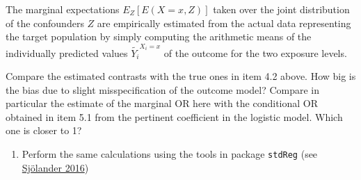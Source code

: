 \documentclass[
]{book}
\newenvironment{Shaded}{\begin{snugshade}}{\end{snugshade}}
\newcommand{\AttributeTok}[1]{\textcolor[rgb]{0.13,0.29,0.53}{#1}}
\newcommand{\DecValTok}[1]{\textcolor[rgb]{0.00,0.00,0.81}{#1}}
\newcommand{\FunctionTok}[1]{\textcolor[rgb]{0.13,0.29,0.53}{\textbf{#1}}}
\newcommand{\NormalTok}[1]{#1}
\newcommand{\OtherTok}[1]{\textcolor[rgb]{0.56,0.35,0.01}{#1}}
\newcommand{\SpecialCharTok}[1]{\textcolor[rgb]{0.81,0.36,0.00}{\textbf{#1}}}
\newcommand{\StringTok}[1]{\textcolor[rgb]{0.31,0.60,0.02}{#1}}
\providecommand{\tightlist}{%
  \setlength{\itemsep}{0pt}\setlength{\parskip}{0pt}}
\begin{document}
\begin{Shaded}
\end{Shaded}

The marginal expectations \(E_Z[E(X=x, Z)]\) taken over the
joint distribution of
the confounders \(Z\) are empirically estimated from
the actual data representing the target population by simply
computing the arithmetic means of the individually
predicted values \(\widetilde{Y_i}^{X_i=x}\) of the
outcome for the two exposure levels.

Compare the estimated contrasts with the true ones in
item 4.2 above.
How big is the bias due to slight misspecification
of the outcome model?
Compare in particular the estimate of the marginal
OR here with the
conditional OR obtained in item 5.1 from the
pertinent coefficient in
the logistic model. Which one is closer to 1?

\begin{enumerate}
\def\labelenumi{\arabic{enumi}.}
\setcounter{enumi}{3}
\tightlist
\item
  Perform the same calculations using the tools
  in package \texttt{stdReg}
  (see \href{https://doi.org/10.1007/s10654-016-0157-3}{Sjölander 2016})
\end{enumerate}

\begin{Shaded}
\end{Shaded}
\end{document}
